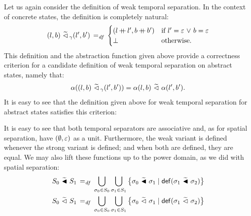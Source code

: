 \documentclass[11pt]{report}         %
\begin{document}
Let us again consider the definition of weak temporal separation. In the context of concrete states, the definition is completely natural: \[ (l,b) \operatorname{\,\widetilde{\vartriangleleft}\,}_\gamma (l',b') \operatorname{\;=_{\mathit{df}}\;} \begin{cases}
(l \operatorname{+\!\!\!+} l', b \operatorname{+\!\!\!+} b') & \text{if $l' = \varepsilon \operatorname{\,\vee\,} b = \varepsilon$} \\
\bot & \text{otherwise.}
\end{cases} \] This definition and the abstraction function given above provide a correctness criterion for a candidate definition of weak temporal separation on abstract states, namely that: \[ \alpha((l,b) \operatorname{\,\widetilde{\vartriangleleft}\,}_\gamma (l',b')) = \alpha(l,b) \operatorname{\,\widetilde{\vartriangleleft}\,} \alpha(l',b').\] It is easy to see that the definition given above for weak temporal separation for abstract states satisfies this criterion: 

It is easy to see that both temporal separators are associative and, as for spatial separation, have $(\operatorname{\emptyset},\varepsilon)$ as a unit. Furthermore, the weak variant is defined whenever the strong variant is defined; and when both are defined, they are equal. We may also lift these functions up to the power domain, as we did with spatial separation: \begin{align*}
    S_0 \operatorname{\,\widetilde{\blacktriangleleft}\,} S_1 \operatorname{\;=_{\mathit{df}}\;} \bigcup_{\sigma_0 \in S_0} \bigcup_{\sigma_1 \in S_1} \left\lbrace \sigma_0 \operatorname{\,\widetilde{\blacktriangleleft}\,} \sigma_1 \mid \mathsf{def}(\sigma_1 \operatorname{\,\widetilde{\blacktriangleleft}\,} \sigma_2) \right\rbrace \\ 
    S_0 \operatorname{\,\widetilde{\vartriangleleft}\,} S_1 \operatorname{\;=_{\mathit{df}}\;} \bigcup_{\sigma_0 \in S_0} \bigcup_{\sigma_1 \in S_1} \left\lbrace \sigma_0 \operatorname{\,\widetilde{\vartriangleleft}\,} \sigma_1 \mid \mathsf{def}(\sigma_1 \operatorname{\,\widetilde{\vartriangleleft}\,} \sigma_2) \right\rbrace
\end{align*}
\end{document}
